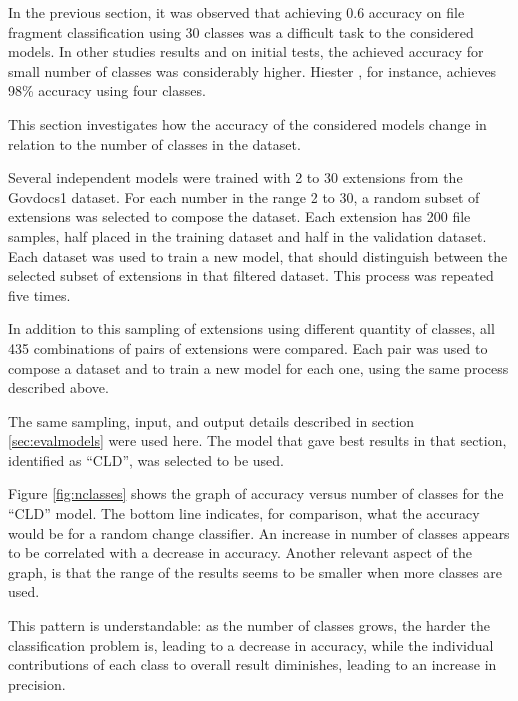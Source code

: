 \label{sec:numberofclasses}
In the previous section, it was observed that achieving 0.6 accuracy on file fragment classification using 30 classes was a difficult task to the considered models. In other studies results \cite{hiester_file_2018} \cite{sportiello_context-based_2012} \cite{amirani_feature-based_2013} \cite{maslim_distributed_2014} and on initial tests, the achieved accuracy for small number of classes was considerably higher. Hiester \cite{hiester_file_2018}, for instance, achieves 98\% accuracy using four classes.

This section investigates how the accuracy of the considered models change in relation to the number of classes in the dataset.


Several independent models were trained with 2 to 30  extensions from the Govdocs1 dataset. For each number in the range 2 to 30, a random subset of extensions was selected to compose the dataset. Each extension has 200 file samples, half placed in the training dataset and half in the validation dataset. Each dataset was used to train a new model, that should distinguish between the selected subset of extensions in that filtered dataset. This process was repeated five times.



In addition to this sampling of extensions using different quantity of classes, all 435 combinations of pairs of extensions were compared. Each pair was used to compose a dataset and to train a new model for each one, using the same process described above.

The same sampling, input, and output details described in section \ref{sec:evalmodels} were used here. The model that gave best results in that section, identified as ``CLD'', was selected to be used.

Figure \ref{fig:nclasses} shows the graph of accuracy versus number of classes for the ``CLD'' model. The bottom line indicates, for comparison, what the accuracy would be for a random change classifier. An increase in number of classes appears to be  correlated with a decrease in accuracy. Another relevant aspect of the graph, is that the range of the results seems to be smaller when more classes are used.  

This pattern is understandable: as the number of classes grows, the harder the classification problem is, leading to a decrease in accuracy, while the individual contributions of each class to overall result diminishes, leading to an increase in precision.

